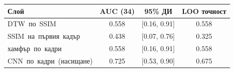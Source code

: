 \begin{tabular}{lccc}
\hline
Слой & AUC (34) & 95\% ДИ & LOO точност \\
\hline
DTW~по~SSIM & 0.558 & [0.16, 0.91] & 0.558 \\
SSIM~на~първия~кадър & 0.438 & [0.07, 0.76] & 0.325 \\
хамфър~по~кадри & 0.558 & [0.16, 0.91] & 0.558 \\
CNN~по~кадри~(насищане) & 0.725 & [0.53, 0.90] & 0.675 \\
\hline
\end{tabular}
